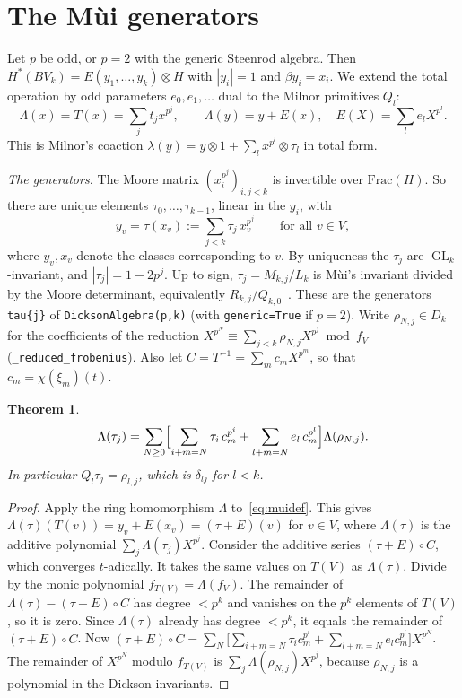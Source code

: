 \documentclass[11pt]{amsart}
\newtheorem{theorem}{Theorem}[section]
\theoremstyle{definition}
\theoremstyle{remark}
\newcommand{\Dk}{D_k}
\newcommand{\code}[1]{\texttt{#1}}
\DeclareMathOperator{\GL}{GL}
\begin{document}
\section{The M\`ui generators}\label{sec:mui}

Let $p$ be odd, or $p=2$ with the generic Steenrod algebra.  Then
$H^*(BV_k)=E(y_1,\dots,y_k)\otimes H$ with $|y_i|=1$ and $\beta y_i=x_i$.  We
extend the total operation by odd parameters $e_0,e_1,\dots$ dual to the Milnor
primitives $Q_l$:
\[
  \Lambda(x)=T(x)=\sum_jt_jx^{p^j},\qquad
  \Lambda(y)=y+E(x),\quad E(X)=\sum_le_lX^{p^l}.
\]
This is Milnor's coaction $\lambda(y)=y\otimes1+\sum_lx^{p^l}\otimes\tau_l$ in
total form.

\emph{The generators.}  The Moore matrix $(x_i^{p^j})_{i,j<k}$ is invertible
over $\mathrm{Frac}(H)$.  So there are unique elements $\tau_0,\dots,\tau_{k-1}$,
linear in the $y_i$, with
\begin{equation}\label{eq:muidef}
  y_v=\tau(x_v):=\sum_{j<k}\tau_j\,x_v^{p^j}\qquad\text{for all }v\in V,
\end{equation}
where $y_v,x_v$ denote the classes corresponding to $v$.  By uniqueness the
$\tau_j$ are $\GL_k$-invariant, and $|\tau_j|=1-2p^j$.  Up to sign,
$\tau_j=M_{k,j}/L_k$ is M\`ui's invariant divided by the Moore determinant,
equivalently $R_{k,j}/Q_{k,0}$~\cite{Mui}.  These are the generators
\code{tau\{j\}} of \code{DicksonAlgebra(p,k)} (with \code{generic=True} if
$p=2$).  Write $\rho_{N,j}\in\Dk$ for the coefficients of the reduction
$X^{p^N}\equiv\sum_{j<k}\rho_{N,j}X^{p^j}\bmod f_V$
(\code{\_reduced\_frobenius}).  Also let $C=T^{-1}=\sum_mc_mX^{p^m}$, so that
$c_m=\chi(\xi_m)(t)$.

\begin{theorem}\label{thm:mui}
\[
  \Lambda(\tau_j)=\sum_{N\ge0}\Bigl[\sum_{i+m=N}\tau_i\,c_m^{p^i}
  +\sum_{l+m=N}e_l\,c_m^{p^l}\Bigr]\Lambda(\rho_{N,j}) .
\]
In particular $Q_l\tau_j=\rho_{l,j}$, which is $\delta_{lj}$ for $l<k$.
\end{theorem}

\begin{proof}
Apply the ring homomorphism $\Lambda$ to~\eqref{eq:muidef}.  This gives
$\Lambda(\tau)(T(v))=y_v+E(x_v)=(\tau+E)(v)$ for $v\in V$, where $\Lambda(\tau)$
is the additive polynomial $\sum_j\Lambda(\tau_j)X^{p^j}$.  Consider the
additive series $(\tau+E)\circ C$, which converges $t$-adically.  It takes the
same values on $T(V)$ as $\Lambda(\tau)$.  Divide by the monic polynomial
$f_{T(V)}=\Lambda(f_V)$.  The remainder of $\Lambda(\tau)-(\tau+E)\circ C$ has
degree $<p^k$ and vanishes on the $p^k$ elements of $T(V)$, so it is zero.
Since $\Lambda(\tau)$ already has degree $<p^k$, it equals the remainder of
$(\tau+E)\circ C$.  Now
$(\tau+E)\circ C=\sum_N\bigl[\sum_{i+m=N}\tau_ic_m^{p^i}+\sum_{l+m=N}e_lc_m^{p^l}\bigr]X^{p^N}$.
The remainder of $X^{p^N}$ modulo $f_{T(V)}$ is
$\sum_j\Lambda(\rho_{N,j})X^{p^j}$, because $\rho_{N,j}$ is a polynomial in the
Dickson invariants.
\end{proof}
\end{document}
